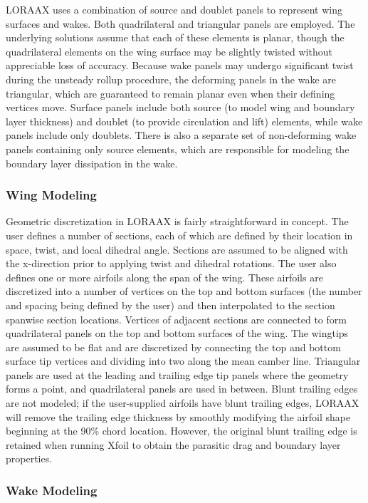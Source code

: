 \documentclass[11pt]{article}
\begin{document}
LORAAX uses a combination of source and doublet panels to represent wing
surfaces and wakes. Both quadrilateral and triangular panels are employed.
The underlying solutions assume that each of these elements is planar, though
the quadrilateral elements on the wing surface may be slightly twisted without
appreciable loss of accuracy. Because wake panels may undergo significant
twist during the unsteady rollup procedure, the deforming panels in the wake
are triangular, which are guaranteed to remain planar even when their defining
vertices move. Surface panels include both source (to model wing and boundary
layer thickness) and doublet (to provide circulation and lift) elements, while
wake panels include only doublets. There is also a separate set of
non-deforming wake panels containing only source elements, which are responsible
for modeling the boundary layer dissipation in the wake.

\subsubsection{Wing Modeling}

Geometric discretization in LORAAX is fairly straightforward in concept. The
user defines a number of sections, each of which are defined by their location
in space, twist, and local dihedral angle. Sections are assumed to be aligned
with the x-direction prior to applying twist and dihedral rotations. The user
also defines one or more airfoils along the span of the wing. These airfoils
are discretized into a number of vertices on the top and bottom surfaces (the
number and spacing being defined by the user) and then interpolated to the
section spanwise section locations. Vertices of adjacent sections are connected
to form quadrilateral panels on the top and bottom surfaces of the wing. The
wingtips are assumed to be flat and are discretized by connecting the top and
bottom surface tip vertices and dividing into two along the mean camber line.
Triangular panels are used at the leading and trailing edge tip panels where the
geometry forms a point, and quadrilateral panels are used in between. Blunt
trailing edges are not modeled; if the user-supplied airfoils have blunt
trailing edges, LORAAX will remove the trailing edge thickness by smoothly
modifying the airfoil shape beginning at the 90\% chord location. However, the
original blunt trailing edge is retained when running Xfoil to obtain the
parasitic drag and boundary layer properties.

\subsubsection{Wake Modeling}
\end{document}
